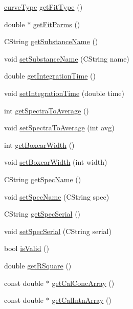 \begin{DoxyCompactItemize}
\item 
\hyperlink{classCCalibrationCurve_ab9d3dc7e1f672a8bd6b7705f94798b7a}{curveType} \hyperlink{classCCalibrationCurve_ad8f09357c0155b1518c34ee652fbe1a5}{getFitType} ()
\item 
double $\ast$ \hyperlink{classCCalibrationCurve_a6474aaaaa9ad9cfaef29256a475a1695}{getFitParms} ()
\item 
CString \hyperlink{classCCalibrationCurve_a9860f94981c46b2a933450327310f678}{getSubstanceName} ()
\item 
void \hyperlink{classCCalibrationCurve_af38083f137498c03dd93076687fedc57}{setSubstanceName} (CString name)
\item 
double \hyperlink{classCCalibrationCurve_aabe946263d40abf2e8bec421a778d8a9}{getIntegrationTime} ()
\item 
void \hyperlink{classCCalibrationCurve_ae733513f42ac7e366625c0af777b9bc7}{setIntegrationTime} (double time)
\item 
int \hyperlink{classCCalibrationCurve_a3e9061278432be5d21940911d20ce563}{getSpectraToAverage} ()
\item 
void \hyperlink{classCCalibrationCurve_a106f0479b4403fb1522d776795a7689d}{setSpectraToAverage} (int avg)
\item 
int \hyperlink{classCCalibrationCurve_aa75d2639eebd9d63513287bea713699e}{getBoxcarWidth} ()
\item 
void \hyperlink{classCCalibrationCurve_aecdd598c14f9953cf746e41b985957c9}{setBoxcarWidth} (int width)
\item 
CString \hyperlink{classCCalibrationCurve_a051983b27dad60c67cc42083e48652ca}{getSpecName} ()
\item 
void \hyperlink{classCCalibrationCurve_a7a09f42bb8f962bfa146747dcff3cf73}{setSpecName} (CString spec)
\item 
CString \hyperlink{classCCalibrationCurve_a1ac9c3231165a6038ea99caf09f4595d}{getSpecSerial} ()
\item 
void \hyperlink{classCCalibrationCurve_ab2a5908c9ea158c72bb334cbca19df92}{setSpecSerial} (CString serial)
\item 
bool \hyperlink{classCCalibrationCurve_a437859e13307f1539b08bbd8455cc71e}{isValid} ()
\item 
double \hyperlink{classCCalibrationCurve_a5ddfcd77d6ef18355b44f512875a581e}{getRSquare} ()
\item 
const double $\ast$ \hyperlink{classCCalibrationCurve_ae83a15c78f4e66f065d43f136ddf2f50}{getCalConcArray} ()
\item 
const double $\ast$ \hyperlink{classCCalibrationCurve_aa3c562cb790998230c1c214a0339474b}{getCalIntnArray} ()

\end{DoxyCompactItemize}
